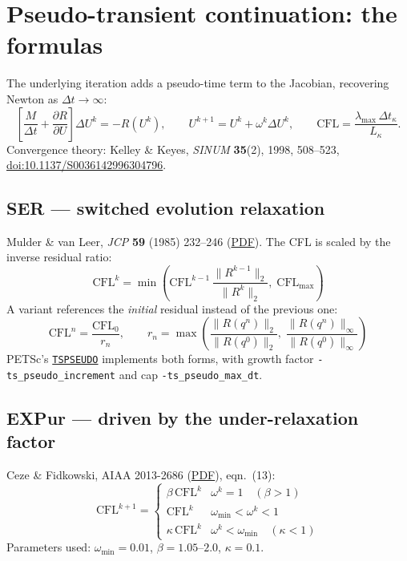 \documentclass[11pt,a4paper]{article}
\newcommand{\code}[1]{\texttt{\small #1}}
\begin{document}
\section{Pseudo-transient continuation: the formulas}

The underlying iteration adds a pseudo-time term to the Jacobian, recovering Newton as
$\Delta t \to \infty$:
\begin{equation}
\left[ \frac{M}{\Delta t} + \frac{\partial R}{\partial U} \right] \Delta U^k = -R(U^k),
\qquad U^{k+1} = U^k + \omega^k \Delta U^k,
\qquad \mathrm{CFL} = \frac{\lambda_{\max}\,\Delta t_\kappa}{L_\kappa}.
\end{equation}
Convergence theory: Kelley \& Keyes, \emph{SINUM} \textbf{35}(2), 1998, 508--523,
\href{https://doi.org/10.1137/S0036142996304796}{doi:10.1137/S0036142996304796}.

\subsection{SER --- switched evolution relaxation}
Mulder \& van Leer, \emph{JCP} \textbf{59} (1985) 232--246
(\href{https://homepage.tudelft.nl/a1k53/Papers/Journal/JCP59_Mulder.pdf}{PDF}). The CFL is
scaled by the inverse residual ratio:
\begin{equation}
\mathrm{CFL}^k = \min\!\left( \mathrm{CFL}^{k-1}\,
\frac{\lVert R^{k-1}\rVert_2}{\lVert R^{k}\rVert_2},\; \mathrm{CFL}_{\max} \right)
\end{equation}
A variant references the \emph{initial} residual instead of the previous one:
\begin{equation}
\mathrm{CFL}^n = \frac{\mathrm{CFL}_0}{r_n}, \qquad
r_n = \max\!\left( \frac{\lVert R(q^n)\rVert_2}{\lVert R(q^0)\rVert_2},\;
\frac{\lVert R(q^n)\rVert_\infty}{\lVert R(q^0)\rVert_\infty} \right)
\end{equation}
PETSc's \href{https://petsc.org/main/manualpages/TS/TSPSEUDO/}{\code{TSPSEUDO}} implements both
forms, with growth factor \code{-ts\_pseudo\_increment} and cap \code{-ts\_pseudo\_max\_dt}.

\subsection{EXPur --- driven by the under-relaxation factor}
Ceze \& Fidkowski, AIAA 2013-2686
(\href{https://public.websites.umich.edu/~kfid/MYPUBS/Ceze_Fidkowski_2013_PTC.pdf}{PDF}), eqn.~(13):
\begin{equation}
\mathrm{CFL}^{k+1} =
\begin{cases}
\beta\,\mathrm{CFL}^k & \omega^k = 1 \quad (\beta>1)\\
\mathrm{CFL}^k & \omega_{\min} < \omega^k < 1\\
\kappa\,\mathrm{CFL}^k & \omega^k < \omega_{\min} \quad (\kappa<1)
\end{cases}
\end{equation}
Parameters used: $\omega_{\min}=0.01$, $\beta = 1.05$--$2.0$, $\kappa = 0.1$.
\end{document}
